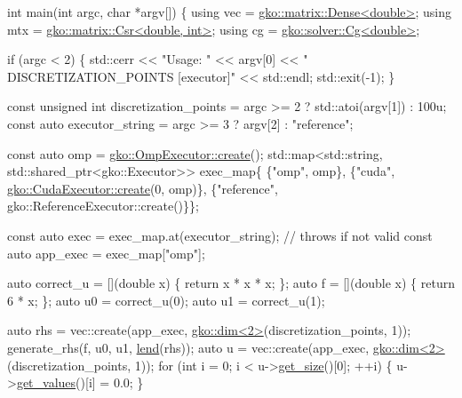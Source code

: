 \begin{DoxyCodeInclude}
\textcolor{keywordtype}{int} main(\textcolor{keywordtype}{int} argc, \textcolor{keywordtype}{char} *argv[])
\{
    \textcolor{keyword}{using} vec = \hyperlink{classgko_1_1matrix_1_1Dense}{gko::matrix::Dense<double>};
    \textcolor{keyword}{using} mtx = \hyperlink{classgko_1_1matrix_1_1Csr}{gko::matrix::Csr<double, int>};
    \textcolor{keyword}{using} cg = \hyperlink{classgko_1_1solver_1_1Cg}{gko::solver::Cg<double>};

    \textcolor{keywordflow}{if} (argc < 2) \{
        std::cerr << \textcolor{stringliteral}{"Usage: "} << argv[0] << \textcolor{stringliteral}{" DISCRETIZATION\_POINTS [executor]"}
                  << std::endl;
        std::exit(-1);
    \}

    \textcolor{keyword}{const} \textcolor{keywordtype}{unsigned} \textcolor{keywordtype}{int} discretization\_points =
        argc >= 2 ? std::atoi(argv[1]) : 100u;
    \textcolor{keyword}{const} \textcolor{keyword}{auto} executor\_string = argc >= 3 ? argv[2] : \textcolor{stringliteral}{"reference"};

    \textcolor{keyword}{const} \textcolor{keyword}{auto} omp = \hyperlink{classgko_1_1OmpExecutor_a33ca05fdd0fc928ee262fc9425304874}{gko::OmpExecutor::create}();
    std::map<std::string, std::shared\_ptr<gko::Executor>> exec\_map\{
        \{\textcolor{stringliteral}{"omp"}, omp\},
        \{\textcolor{stringliteral}{"cuda"}, \hyperlink{classgko_1_1CudaExecutor_a2718a92034350650ef406ffdb60db090}{gko::CudaExecutor::create}(0, omp)\},
        \{\textcolor{stringliteral}{"reference"}, gko::ReferenceExecutor::create()\}\};

    \textcolor{keyword}{const} \textcolor{keyword}{auto} exec = exec\_map.at(executor\_string);  \textcolor{comment}{// throws if not valid}
    \textcolor{keyword}{const} \textcolor{keyword}{auto} app\_exec = exec\_map[\textcolor{stringliteral}{"omp"}];

    \textcolor{keyword}{auto} correct\_u = [](\textcolor{keywordtype}{double} x) \{ \textcolor{keywordflow}{return} x * x * x; \};
    \textcolor{keyword}{auto} f = [](\textcolor{keywordtype}{double} x) \{ \textcolor{keywordflow}{return} 6 * x; \};
    \textcolor{keyword}{auto} u0 = correct\_u(0);
    \textcolor{keyword}{auto} u1 = correct\_u(1);

    \textcolor{keyword}{auto} rhs = vec::create(app\_exec, \hyperlink{structgko_1_1dim}{gko::dim<2>}(discretization\_points, 1));
    generate\_rhs(f, u0, u1, \hyperlink{namespacegko_aa8cb4876b72e5e1036ea9575443c439b}{lend}(rhs));
    \textcolor{keyword}{auto} u = vec::create(app\_exec, \hyperlink{structgko_1_1dim}{gko::dim<2>}(discretization\_points, 1));
    \textcolor{keywordflow}{for} (\textcolor{keywordtype}{int} i = 0; i < u->\hyperlink{classgko_1_1LinOp_a31b3c003388eb0b95393154f68c2b98d}{get\_size}()[0]; ++i) \{
        u->\hyperlink{classgko_1_1matrix_1_1Dense_a3bc458e02fab8e4c9f60f70bd4d5a4f9}{get\_values}()[i] = 0.0;
    \}


\end{DoxyCodeInclude}
